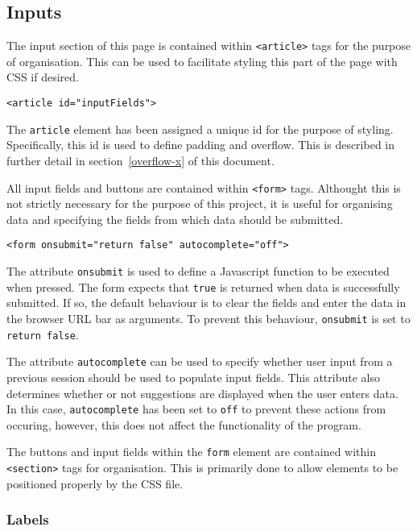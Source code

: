 \documentclass[letterpaper]{article}
\begin{document}
\subsection{Inputs}

The input section of this page is contained within \lstinline{<article>} tags for the purpose of organisation.
This can be used to facilitate styling this part of the page with CSS if desired.

\begin{lstlisting}[firstnumber=10]
<article id="inputFields">
\end{lstlisting}

The \lstinline{article} element has been assigned a unique id for the purpose of styling.
Specifically, this id is used to define padding and overflow.
This is described in further detail in section~\ref{overflow-x} of this document.

All input fields and buttons are contained within \lstinline{<form>} tags.
Althought this is not strictly necessary for the purpose of this project, it is useful for organising data and specifying the fields from which data should be submitted.

\begin{lstlisting}[firstnumber=11]
<form onsubmit="return false" autocomplete="off">
\end{lstlisting}

The attribute \lstinline{onsubmit} is used to define a Javascript function to be executed when pressed.
The form expects that \lstinline{true} is returned when data is successfully submitted.
If so, the default behaviour is to clear the fields and enter the data in the browser URL bar as arguments.
To prevent this behaviour, \lstinline{onsubmit} is set to \lstinline{return false}.

The attribute \lstinline{autocomplete} can be used to specify whether user input from a previous session should be used to populate input fields.
This attribute also determines whether or not suggestions are displayed when the user enters data.
In this case, \lstinline{autocomplete} has been set to \lstinline{off} to prevent these actions from occuring, however, this does not affect the functionality of the program.

The buttons and input fields within the \lstinline{form} element are contained within \lstinline{<section>} tags for organisation.
This is primarily done to allow elements to be positioned properly by the CSS file.

\subsubsection{Labels}
\end{document}
